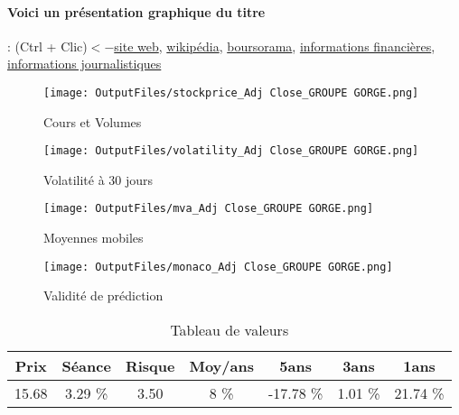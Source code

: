 \documentclass[11pt,a4paper]{report}%
\begin{document}
\paragraph{Voici un présentation graphique du titre} : (Ctrl + Clic)$<-$\href{http://www.groupe-gorge.com/}{site web}, \href{https://fr.wikipedia.org/wiki/Groupe_Gorg%C3%A9}{wikipédia}, \href{https://www.boursorama.com/cours/1rPGOE}{boursorama}, \href{https://www.qwant.com/?q=site:https:%2f%2fwww.easybourse.com%2faction-societe%2fGROUPE-GORGE&t=web&client=ext-firefox-hp}{informations financières}, \href{https://bourse.lerevenu.com/cours-de-bourse/fiche-valeur-synthese/GROUPE-GORGE/GOE-FR}{informations journalistiques}
\begin{figure}[!htb]
   \begin{minipage}{0.5\textwidth}
     \centering
     \texttt{[image: OutputFiles/stockprice\_Adj Close\_GROUPE GORGE.png]}
     \caption{Cours et Volumes}\label{Fig:price_GROUPE GORGE}
   \end{minipage}\hfill
   \begin{minipage}{0.5\textwidth}
     \centering
     \texttt{[image: OutputFiles/volatility\_Adj Close\_GROUPE GORGE.png]}
     \caption{Volatilité à 30 jours}\label{Fig:volat_GROUPE GORGE}
   \end{minipage}
\end{figure}
\begin{figure}[!htb]
   \begin{minipage}{0.5\textwidth}
     \centering
     \texttt{[image: OutputFiles/mva\_Adj Close\_GROUPE GORGE.png]}
     \caption{Moyennes mobiles}\label{Fig:mva_GROUPE GORGE}
   \end{minipage}\hfill
   \begin{minipage}{0.5\textwidth}
     \centering
     \texttt{[image: OutputFiles/monaco\_Adj Close\_GROUPE GORGE.png]}
     \caption{Validité de prédiction}\label{Fig:prediction_GROUPE GORGE}
   \end{minipage}
\end{figure}

\begin{table}[H]
  \centering
    \begin{tabular}{|c|c|c|c|c|c|c|}
    \hline
    Prix & Séance & Risque  & Moy/ans & 5ans & 3ans & 1ans \\
    \hline
    15.68 &    3.29 \%    & 3.50 & 8 \% & -17.78 \% & 1.01 \% & 21.74 \% \\
    \hline
    \end{tabular}%
        \label{tab:table_GROUPE GORGE}%
      \caption{Tableau de valeurs}
\end{table}%
\end{document}
